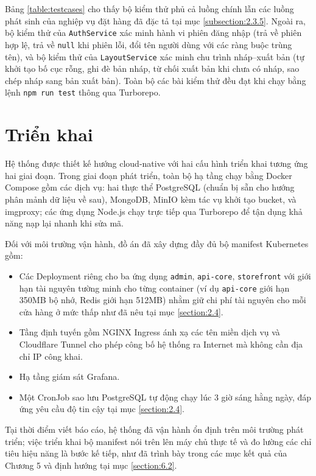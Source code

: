\documentclass[../main.tex]{subfiles}
\begin{document}
Bảng \ref{table:testcases} cho thấy bộ kiểm thử phủ cả luồng chính lẫn các luồng phát sinh của nghiệp vụ đặt hàng đã đặc tả tại mục \ref{subsection:2.3.5}. Ngoài ra, bộ kiểm thử của \texttt{AuthService} xác minh hành vi phiên đăng nhập (trả về phiên hợp lệ, trả về \texttt{null} khi phiên lỗi, đổi tên người dùng với các ràng buộc trùng tên), và bộ kiểm thử của \texttt{LayoutService} xác minh chu trình nháp--xuất bản (tự khởi tạo bố cục rỗng, ghi đè bản nháp, từ chối xuất bản khi chưa có nháp, sao chép nháp sang bản xuất bản). Toàn bộ các bài kiểm thử đều đạt khi chạy bằng lệnh \texttt{npm run test} thông qua Turborepo.

\section{Triển khai}
\label{section:4.5}

Hệ thống được thiết kế hướng cloud-native với hai cấu hình triển khai tương ứng hai giai đoạn. Trong giai đoạn phát triển, toàn bộ hạ tầng chạy bằng Docker Compose gồm các dịch vụ: hai thực thể PostgreSQL (chuẩn bị sẵn cho hướng phân mảnh dữ liệu về sau), MongoDB, MinIO kèm tác vụ khởi tạo bucket, và imgproxy; các ứng dụng Node.js chạy trực tiếp qua Turborepo để tận dụng khả năng nạp lại nhanh khi sửa mã.

Đối với môi trường vận hành, đồ án đã xây dựng đầy đủ bộ manifest Kubernetes gồm:

\begin{itemize}
    \item Các Deployment riêng cho ba ứng dụng \texttt{admin}, \texttt{api-core}, \texttt{storefront} với giới hạn tài nguyên tường minh cho từng container (ví dụ \texttt{api-core} giới hạn 350MB bộ nhớ, Redis giới hạn 512MB) nhằm giữ chi phí tài nguyên cho mỗi cửa hàng ở mức thấp như đã nêu tại mục \ref{section:2.4}.
    \item Tầng định tuyến gồm NGINX Ingress ánh xạ các tên miền dịch vụ và Cloudflare Tunnel cho phép công bố hệ thống ra Internet mà không cần địa chỉ IP công khai.
    \item Hạ tầng giám sát Grafana.
    \item Một CronJob sao lưu PostgreSQL tự động chạy lúc 3 giờ sáng hằng ngày, đáp ứng yêu cầu độ tin cậy tại mục \ref{section:2.4}.
\end{itemize}

Tại thời điểm viết báo cáo, hệ thống đã vận hành ổn định trên môi trường phát triển; việc triển khai bộ manifest nói trên lên máy chủ thực tế và đo lường các chỉ tiêu hiệu năng là bước kế tiếp, như đã trình bày trong các mục kết quả của Chương 5 và định hướng tại mục \ref{section:6.2}.
\end{document}
